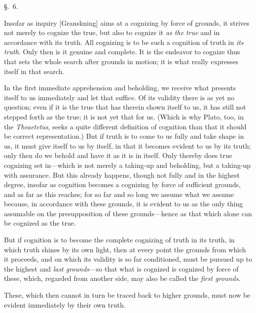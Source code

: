 \documentclass[12pt,a4paper]{book}
\begin{document}
\begin{center}\large\S.~6.\end{center}
Insofar as inquiry [Granskning] aims at a cognizing by force of grounds, it
strives not merely to cognize the true, but also to cognize it \emph{as the true} and in
accordance with its truth. All cognizing is to be such a cognition of truth in
\emph{its truth}. Only then is it genuine and complete. It is the endeavor to
cognize thus that sets the whole search after grounds in motion; it is what
really expresses itself in that search.

In the first immediate apprehension and beholding, we receive what presents
itself to us immediately and let that suffice. Of its validity there is as yet no
question; even if it is the true that has therein shown itself to us, it has still
not stepped forth as the true; it is not yet that for us. (Which is why Plato,
too, in the \textit{Theaetetus}, seeks a quite different definition of cognition
than that it should be correct representation.) But if truth is to come to us
fully and take shape in us, it must give itself to us by itself, in that it
becomes evident to us by its truth; only then do we behold and have it as it is in
itself. Only thereby does true cognizing set in---which is not merely a taking-up
and beholding, but a taking-up with assurance. But this already happens, though
not fully and in the highest degree, insofar as cognition becomes a cognizing by
force of sufficient grounds, and as far as this reaches; for so far and so long we
assume what we assume because, in accordance with these grounds, it is evident to
us as the only thing assumable on the presupposition of these grounds---hence as
that which alone can be cognized as the true.

But if cognition is to become the complete cognizing of truth in its truth, in
which truth shines by its own light, then at every point the grounds from which it
proceeds, and on which its validity is so far conditioned, must be pursued up to
the highest and \emph{last grounds}---so that what is cognized is cognized by
force of these, which, regarded from another side, may also be called the
\emph{first grounds}.

These, which then cannot in turn be traced back to higher grounds, must now be
evident immediately by their own truth.
\end{document}
